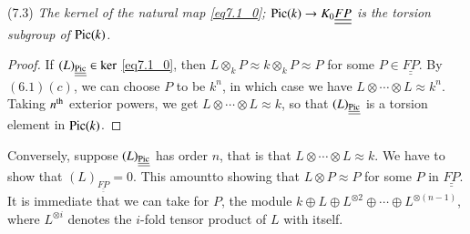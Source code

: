 (7.3) \textit{The kernel of the natural map \ref{eq7.1_0}; $\operatorname{Pic} (k) \to K_0
\underline{\underline{FP}}$ is the torsion subgroup of $\operatorname{Pic} (k)$.}

\begin{proof}
If $(L)_{\underline{\underline{\operatorname{Pic}}}} \in \ker$ \ref{eq7.1_0},
  then $L \otimes_k P 
\approx k \otimes_k P \approx  P$ for some $P \in
\underline{\underline{FP}}$. By 
$(6.1)(c)$, we can choose $P$ to be $k^n$, in which case we have $L
\otimes \cdots \otimes L\approx k^n$. Taking $n^{\rm th}$ exterior powers,
we get $L \otimes \cdots \otimes L\approx k$, so that
$(L)_{\underline{\underline{\operatorname{Pic}}}}$ is a torsion element in $\operatorname{Pic} (k)$. 
  \end{proof}  
  
  Conversely, suppose $(L)_{\underline{\underline{\operatorname{Pic}}}}$ has  order $n$, that is
  that $L \otimes \cdots \otimes L \approx k$. We have to show that
  $(L)_{\underline{\underline{FP}}} =0$. This amount\pageoriginale to showing that
  $L \otimes P   \approx P$ for some $P$ in
  $\underline{\underline{FP}}$. It is immediate that we 
  can take for $P$, the module  $k \oplus L \oplus L^{\otimes 2}
  \oplus \cdots \oplus L^{\otimes (n-1)}$, where $L^{\otimes i}$
  denotes the $i$-fold tensor product of $L$ with itself. 
  

